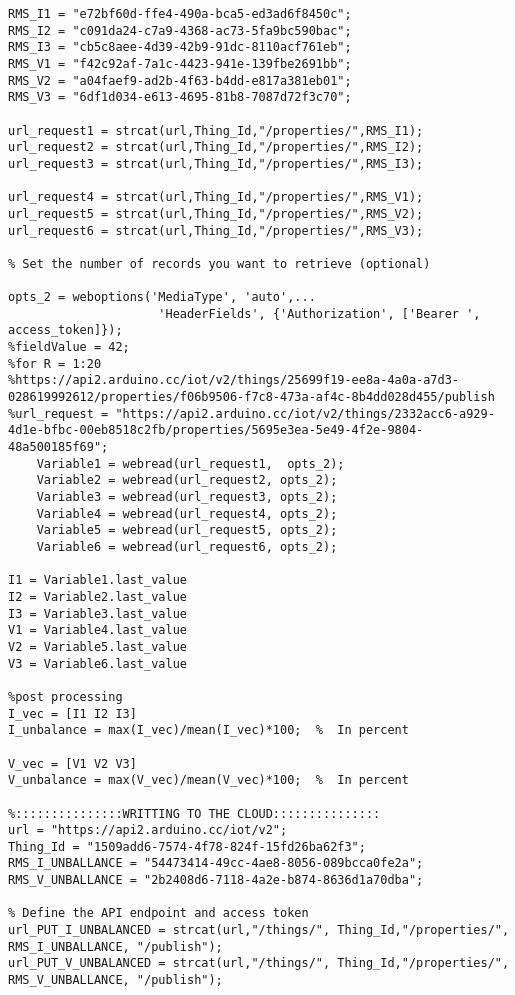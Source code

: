 \begin{lstlisting}[style=Matlab-Pyglike]
RMS_I1 = "e72bf60d-ffe4-490a-bca5-ed3ad6f8450c";
RMS_I2 = "c091da24-c7a9-4368-ac73-5fa9bc590bac";
RMS_I3 = "cb5c8aee-4d39-42b9-91dc-8110acf761eb";
RMS_V1 = "f42c92af-7a1c-4423-941e-139fbe2691bb";
RMS_V2 = "a04faef9-ad2b-4f63-b4dd-e817a381eb01";
RMS_V3 = "6df1d034-e613-4695-81b8-7087d72f3c70";

url_request1 = strcat(url,Thing_Id,"/properties/",RMS_I1);
url_request2 = strcat(url,Thing_Id,"/properties/",RMS_I2);
url_request3 = strcat(url,Thing_Id,"/properties/",RMS_I3);

url_request4 = strcat(url,Thing_Id,"/properties/",RMS_V1);
url_request5 = strcat(url,Thing_Id,"/properties/",RMS_V2);
url_request6 = strcat(url,Thing_Id,"/properties/",RMS_V3);

% Set the number of records you want to retrieve (optional)

opts_2 = weboptions('MediaType', 'auto',...
                     'HeaderFields', {'Authorization', ['Bearer ', access_token]});
%fieldValue = 42;
%for R = 1:20
%https://api2.arduino.cc/iot/v2/things/25699f19-ee8a-4a0a-a7d3-028619992612/properties/f06b9506-f7c8-473a-af4c-8b4dd028d455/publish
%url_request = "https://api2.arduino.cc/iot/v2/things/2332acc6-a929-4d1e-bfbc-00eb8518c2fb/properties/5695e3ea-5e49-4f2e-9804-48a500185f69";
    Variable1 = webread(url_request1,  opts_2);
    Variable2 = webread(url_request2, opts_2);
    Variable3 = webread(url_request3, opts_2);
    Variable4 = webread(url_request4, opts_2);
    Variable5 = webread(url_request5, opts_2);
    Variable6 = webread(url_request6, opts_2);
 
I1 = Variable1.last_value
I2 = Variable2.last_value
I3 = Variable3.last_value
V1 = Variable4.last_value
V2 = Variable5.last_value
V3 = Variable6.last_value

%post processing
I_vec = [I1 I2 I3]
I_unbalance = max(I_vec)/mean(I_vec)*100;  %  In percent

V_vec = [V1 V2 V3]
V_unbalance = max(V_vec)/mean(V_vec)*100;  %  In percent

%:::::::::::::::WRITTING TO THE CLOUD:::::::::::::::
url = "https://api2.arduino.cc/iot/v2";
Thing_Id = "1509add6-7574-4f78-824f-15fd26ba62f3";
RMS_I_UNBALLANCE = "54473414-49cc-4ae8-8056-089bcca0fe2a";
RMS_V_UNBALLANCE = "2b2408d6-7118-4a2e-b874-8636d1a70dba";

% Define the API endpoint and access token
url_PUT_I_UNBALANCED = strcat(url,"/things/", Thing_Id,"/properties/", RMS_I_UNBALLANCE, "/publish");
url_PUT_V_UNBALANCED = strcat(url,"/things/", Thing_Id,"/properties/", RMS_V_UNBALLANCE, "/publish");



\end{lstlisting}
